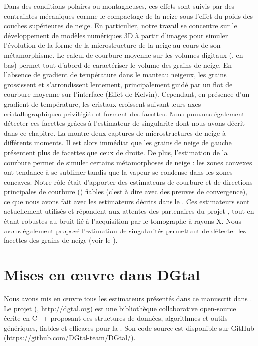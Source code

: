 Dans des conditions polaires ou montagneuses, ces effets sont suivis par des
contraintes mécaniques comme le compactage de la neige sous l'effet du poids des
couches supérieures de neige. En particulier, notre travail se concentre sur le
développement de modèles numériques 3D à partir d'images pour simuler
l'évolution de la forme de la microstructure de la neige au cours de son
métamorphisme. Le calcul de courbure moyenne sur les volumes digitaux
(, en bas) permet tout d'abord de caractériser
le volume des grains de neige. En l'absence de gradient de température dans le
manteau neigeux, les grains grossissent et s'arrondissent lentement,
principalement guidé par un flot de courbure moyenne sur l'interface (Effet de
Kelvin). Cependant, en présence d'un gradient de température, les cristaux
croissent suivant leurs axes cristallographiques privilégiés et forment des
facettes. Nous pouvons également détecter ces facettes grâces à l'estimateur de
singularité dont nous avons décrit dans ce chapitre. La
 montre deux captures de microstructures de
neige à différents moments. Il est alors immédiat que les grains de neige de
gauche présentent plus de facettes que ceux de droite. De plus, l'estimation de
la courbure permet de simuler certains métamorphoses de neige : les zones
convexes ont tendance à se sublimer tandis que la vapeur se condense dans les
zones concaves. Notre rôle était d'apporter des estimateurs de courbure et de
directions principales de courbure ()
fiables (c'est à dire avec des preuves de convergence), ce que nous avons fait
avec les estimateurs décrits dans le . Ces
estimateurs sont actuellement utilisés et répondent aux attentes des partenaires
du projet \digitalSnow, tout en étant robustes au bruit lié à l'acquisition par
le tomographe à rayons X. Nous avons également proposé l'estimation de
singularités permettant de détecter les facettes des grains de neige (voir le
).

\section{Mises en œuvre dans DGtal}%
\label{sec:applications:dgtal}
%
Nous avons mis en œuvre tous les estimateurs présentés dans ce manuscrit dans
\DGtal \cite{DGtal}. Le projet \DGtal (,
\url{http://dgtal.org}) est une bibliothèque collaborative open-source écrite en
\textsc{C++} proposant des structures de données, algorithmes et outils
génériques, fiables et efficaces pour la \DigitalGeometry. Son code source est
disponible sur GitHub (\url{https://github.com/DGtal-team/DGtal/}).

